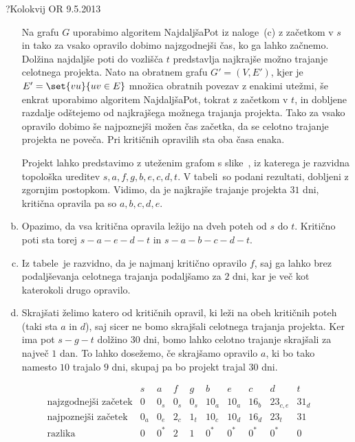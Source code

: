 \begin{naloga}{?}{Kolokvij OR 9.5.2013}
\begin{odgovor}
\begin{enumerate}[(a)]
Na grafu $G$ uporabimo algoritem {\sc NajdaljšaPot} iz naloge~\res[topo]{}(c)
z začetkom v $s$ in tako za vsako opravilo dobimo najzgodnejši čas,
ko ga lahko začnemo.
Dolžina najdaljše poti do vozlišča $t$
predstavlja najkrajše možno trajanje ce\-lot\-ne\-ga projekta.
Nato na obratnem grafu $G' = (V, E')$,
kjer je $E' = \set{vu}{uv \in E}$ množica obratnih povezav z enakimi utežmi,
še enkrat uporabimo algoritem {\sc NajdaljšaPot}, tokrat z začetkom v $t$,
in dobljene razdalje odštejemo od najkrajšega možnega trajanja projekta.
Tako za vsako opravilo dobimo še najpoznejši možen čas začetka,
da se celotno trajanje projekta ne poveča.
Pri kritičnih opravilih sta oba časa enaka.

Projekt lahko predstavimo z uteženim grafom s slike~\fig,
iz katerega je razvidna topološka ureditev $s, a, f, g, b, e, c, d, t$.
V tabeli~ so podani rezultati,
dobljeni z zgornjim postopkom.
Vidimo, da je najkrajše trajanje projekta $31$ dni,
kritična opravila pa so $a, b, c, d, e$.

\item Opazimo, da vsa kritična opravila ležijo na dveh poteh od $s$ do $t$.
Kritično poti sta torej $s - a - e - d - t$ in $s - a - b - c - d - t$.

\item Iz tabele~ je razvidno,
da je najmanj kritično opravilo $f$,
saj ga lahko brez podaljševanja celotnega trajanja podaljšamo za $2$ dni,
kar je več kot katerokoli drugo opravilo.

\item Skrajšati želimo katero od kritičnih opravil,
ki leži na obeh kritičnih poteh (taki sta $a$ in $d$),
saj sicer ne bomo skrajšali celotnega trajanja projekta.
Ker ima pot $s - g - t$ dolžino $30$ dni,
bomo lahko celotno trajanje skrajšali za največ $1$ dan.
To lahko dosežemo, če skrajšamo opravilo $a$,
ki bo tako namesto $10$ trajalo $9$ dni,
skupaj pa bo projekt trajal $30$ dni.
\end{enumerate}
%
\begin{slika}
\pgfslika
{}
\end{slika}
%
\begin{tabela}
$$
\begin{array}{r|ccccccccc}
& s & a & f & g & b & e & c & d & t \\ \hline
\text{najzgodnejši začetek} &
0 & 0_s & 0_s & 0_s & 10_a & 10_a & 16_b & 23_{c,e} & 31_d \\
\text{najpoznejši začetek} &
0_a & 0_e & 2_c & 1_t & 10_c & 10_d & 16_d & 23_t & 31 \\
\text{razlika} &
0 & 0^* & 2 & 1 & 0^* & 0^* & 0^* & 0^* & 0
\end{array}
$$
\end{tabela}
\end{odgovor}
\end{naloga}
